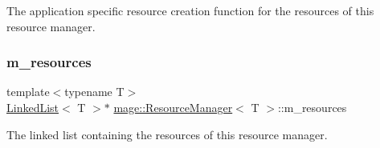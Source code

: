 The application specific resource creation function for the resources of this resource manager. \hypertarget{classmage_1_1_resource_manager_a77b6bacdb28330b1587c7d18585fdea5}{}\label{classmage_1_1_resource_manager_a77b6bacdb28330b1587c7d18585fdea5} 
\subsubsection{\texorpdfstring{m\+\_\+resources}{m\_resources}}
{\footnotesize\ttfamily template$<$typename T$>$ \\
\hyperlink{classmage_1_1_linked_list}{Linked\+List}$<$ T $>$$\ast$ \hyperlink{classmage_1_1_resource_manager}{mage\+::\+Resource\+Manager}$<$ T $>$\+::m\+\_\+resources\hspace{0.3cm}{\ttfamily [private]}}

The linked list containing the resources of this resource manager. 